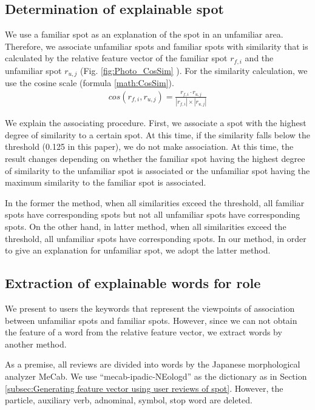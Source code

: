 \documentclass[journal]{IAENGtran}
\begin{document}
\subsection{Determination of explainable spot}
\label{subsec:Determination of explainable spot}
We use a familiar spot as an explanation of the spot in an unfamiliar area.
Therefore, we associate unfamiliar spots and familiar spots with similarity that is calculated by the relative feature vector of the familiar spot $r_{f,i}$ and the unfamiliar spot $r_{u,j}$ (Fig. \ref{fig:Photo_CosSim} ).
For the similarity calculation, we use the cosine scale (formula \ref{math:CosSim}).
\begin{eqnarray}
  cos(r_{f,i},r_{u,j})=\frac{r_{f,i} \cdot r_{u,j}}{|r_{f,i}| \times |r_{u,j}|}
  \label{math:CosSim}
\end{eqnarray}

We explain the associating procedure.
First, we associate a spot with the highest degree of similarity to a certain spot.
At this time, if the similarity falls below the threshold (0.125 in this paper), we do not make association.
At this time, the result changes depending on whether the familiar spot having the highest degree of similarity to the unfamiliar spot is associated or the unfamiliar spot having the maximum similarity to the familiar spot is associated.

In the former the method, when all similarities exceed the threshold, all familiar spots have corresponding spots but not all unfamiliar spots have corresponding spots.
On the other hand, in latter method, when all similarities exceed the threshold, all unfamiliar spots have corresponding spots.
In our method, in order to give an explanation for unfamiliar spot, we adopt the latter method.

\subsection{Extraction of explainable words for role}
\label{subsec:Extraction of explainable words for role}
We present to users the keywords that represent the viewpoints of association between unfamiliar spots and familiar spots.
However, since we can not obtain the feature of a word from the relative feature vector, we extract words by another method.

As a premise, all reviews are divided into words by the Japanese morphological analyzer MeCab.
We use ``mecab-ipadic-NEologd'' as the dictionary as in Section \ref{subsec:Generating feature vector using user reviews of spot}.
However, the particle, auxiliary verb, adnominal, symbol, stop word are deleted.
\end{document}
